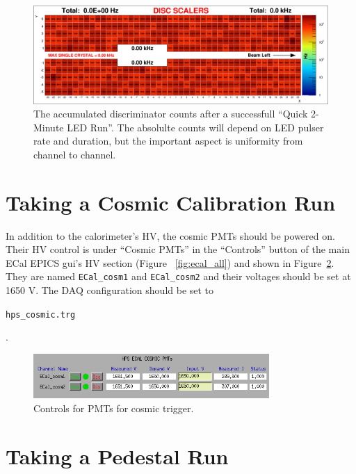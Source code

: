 \documentclass[12pt]{article}
\begin{document}
  \begin{figure}[htbp]\centering
      \includegraphics[width=14cm]{pics/ledScanBlue_2015_04_17_10-45-53.png}
      \caption{The accumulated discriminator counts after a successfull ``Quick 2-Minute LED Run''.  The absolulte counts will depend on LED pulser rate and duration, but the important aspect is uniformity from channel to channel.  \label{fig:quickledscanresult}}
  \end{figure}


   \section{Taking a Cosmic Calibration Run}

   In addition to the calorimeter's HV, the cosmic PMTs should be powered on.  Their HV control is under ``Cosmic PMTs'' in the ``Controls'' button of the main ECal EPICS gui's HV section (Figure ~\ref{fig:ecal_all}) and shown in Figure~\ref{fig:cosmicPMTs}.  They are named \texttt{ECal\_cosm1} and \texttt{ECal\_cosm2} and their voltages should be set at 1650 V.  The DAQ configuration should be set to \begin{center}\texttt{hps\_cosmic.trg}\end{center}.
       \begin{figure}[htbp]\centering
           \includegraphics[width=0.8\textwidth]{pics/cosmicPMTs.png}
           \caption{Controls for PMTs for cosmic trigger.\label{fig:cosmicPMTs}}
       \end{figure}


   \section{Taking a Pedestal Run}
\end{document}
